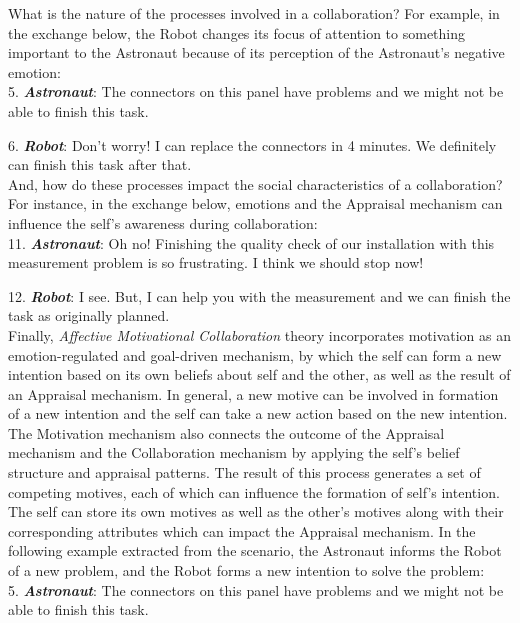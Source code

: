 \documentclass[12pt]{report}
\begin{document}
What is the nature of the processes involved in a collaboration? For example, in
the exchange below, the Robot changes its focus of attention to something
important to the Astronaut because of its perception of the Astronaut's negative
emotion:\\

  5. \textbf{\textit{Astronaut}}: The connectors on this panel have problems and
  we might not be able to finish this task.

  6. \textbf{\textit{Robot}}: Don't worry! I can replace the connectors in 4
  minutes. We definitely can finish this task after that.\\

And, how do these processes impact the social characteristics of a
collaboration? For instance, in the exchange below, emotions and the Appraisal
mechanism can influence the self's awareness during collaboration:\\

  11. \textbf{\textit{Astronaut}}: Oh no! Finishing the quality check of our
  installation with this measurement problem is so frustrating. I think we
  should stop now!

  12. \textbf{\textit{Robot}}: I see. But, I can help you with the measurement
  and we can finish the task as originally planned.\\

Finally, \textit{Affective Motivational Collaboration} theory incorporates
motivation as an emotion-regulated and goal-driven mechanism, by which the self
can form a new intention based on its own beliefs about self and the other, as
well as the result of an Appraisal mechanism. In general, a new motive can
be involved in formation of a new intention and the self can take a new action
based on the new intention. The Motivation mechanism also connects the outcome
of the Appraisal mechanism and the Collaboration mechanism by applying the
self's belief structure and appraisal patterns. The result of this process
generates a set of competing motives, each of which can influence the
formation of self's intention. The self can store its own motives as well as the
other's motives along with their corresponding attributes which can impact the
Appraisal mechanism. In the following example extracted from the scenario, the
Astronaut informs the Robot of a new problem, and the Robot forms a new
intention to solve the problem:\\

  5. \textbf{\textit{Astronaut}}: The connectors on this panel have problems and
  we might not be able to finish this task.
\end{document}
